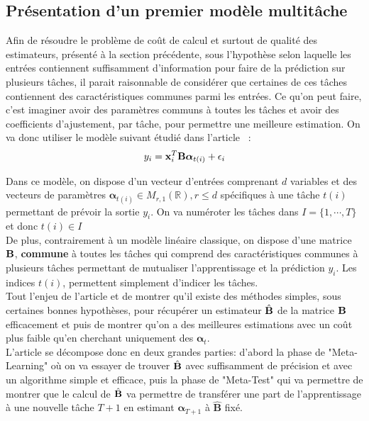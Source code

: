 \documentclass[12pt]{article}
\begin{document}
\subsection{Présentation d'un premier modèle multitâche}
Afin de résoudre le problème de coût de calcul et surtout de qualité des estimateurs, présenté à la section précédente, sous l'hypothèse selon laquelle les entrées contiennent suffisamment d'information pour faire de la prédiction sur plusieurs tâches, il parait raisonnable de considérer que certaines de ces tâches contiennent des caractéristiques communes parmi les entrées. Ce qu'on peut faire, c'est imaginer avoir des paramètres communs à toutes les tâches et avoir des coefficients d'ajustement, par tâche, pour permettre une meilleure estimation. On va donc utiliser le modèle suivant étudié dans l'article \cite{MTLR_1}~:
\\
$$
y_i  = {\bf x}^T_i{\bf B}{\bm \alpha}_{t(i)} + \epsilon_i
$$

\noindent Dans ce modèle, on dispose d'un vecteur d'entrées comprenant $d$ variables et des vecteurs de paramètres ${\bm \alpha}_{t(i)} \in M_{r, 1}(\mathbb{R}), r \leq d$ spécifiques à une tâche $t(i)$ permettant de prévoir la sortie $y_i$. On va numéroter les tâches dans $I = \{1, \cdots, T\}$ et donc $t(i) \in I$\\
De plus, contrairement à un modèle linéaire classique, on dispose d'une matrice ${\bf B}$, \textbf{commune} à toutes les tâches qui comprend des caractéristiques communes à plusieurs tâches permettant de mutualiser l'apprentissage et la prédiction $y_i$. Les indices $t(i)$, permettent simplement d'indicer les tâches. \\

Tout l'enjeu de l'article \cite{MTLR_1} et de montrer qu'il existe des méthodes simples, sous certaines bonnes hypothèses, pour récupérer un estimateur $\hat {\bf B}$ de la matrice ${\bf B}$ efficacement et puis de montrer qu'on a des meilleures estimations avec un coût plus faible qu'en cherchant uniquement des ${\bm \alpha}_{t}$.\\
L'article se décompose donc en deux grandes parties: d'abord la phase de "Meta-Learning" où on va essayer de trouver $\hat {\bf B}$ avec suffisamment de précision et avec un algorithme simple et efficace, puis la phase de "Meta-Test" qui va permettre de montrer que le calcul de $\hat {\bf B}$ va permettre de transférer une part de l'apprentissage à une nouvelle tâche $T+1$ en estimant ${\bm \alpha}_{T+1}$ à $\bm{\hat{B}}$ fixé. 
\end{document}
